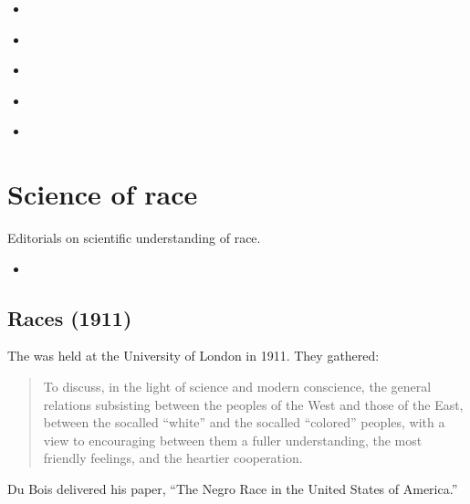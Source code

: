 \documentclass[letterpaper,10pt,english]{jupyterBook}
\begin{document}
\begin{itemize}
\begin{itemize}
\item {} 
\sphinxAtStartPar
{\hyperref[\detokenize{Volumes/11/02/star_of_ethiopia::doc}]{}}

\item {} 
\sphinxAtStartPar
{\hyperref[\detokenize{Volumes/18/03/reconstruction::doc}]{}}

\item {} 
\sphinxAtStartPar
{\hyperref[\detokenize{Volumes/19/01/social_equity::doc}]{}}

\item {} 
\sphinxAtStartPar
{\hyperref[\detokenize{Volumes/34/02/farmers::doc}]{}}

\item {} 
\sphinxAtStartPar
{\hyperref[\detokenize{Volumes/39/01/john_brown::doc}]{}}

\end{itemize}

\end{itemize}


\section{Science of race}
\label{\detokenize{Sections/racescience:science-of-race}}\label{\detokenize{Sections/racescience::doc}}
\sphinxAtStartPar
Editorials on scientific understanding of race.
\begin{itemize}
\item {} 
\sphinxAtStartPar
{\hyperref[\detokenize{Volumes/02/04/races::doc}]{}}

\end{itemize}


\subsection{Races (1911)}
\label{\detokenize{Volumes/02/04/races:races-1911}}\label{\detokenize{Volumes/02/04/races::doc}}
\begin{sphinxShadowBox}
\sphinxstylesidebartitle{}

\sphinxAtStartPar
The  was held at the University of London in 1911. They gathered:
\begin{quote}

\sphinxAtStartPar
To discuss, in the light of science and modern conscience, the general relations subsisting between the peoples of the West and those of the East, between the so\sphinxhyphen{}called “white” and the so\sphinxhyphen{}called “colored” peoples, with a view to encouraging between them a fuller understanding, the most friendly feelings, and the heartier co\sphinxhyphen{}operation.
\end{quote}

\sphinxAtStartPar
Du Bois delivered his paper, “The Negro Race in the United States of America.”
\end{sphinxShadowBox}
\end{document}
